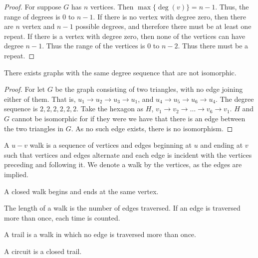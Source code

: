         \begin{proof}
        For suppose $G$ has $n$ vertices. Then $\max\{\deg(v)\} = n-1$. Thus, the range of degrees is $0$ to $n-1$. If there is no vertex with degree zero, then there are $n$ vertex and $n-1$ possible degrees, and therefore there must be at least one repeat. If there is a vertex with degree zero, then none of the vertices can have degree $n-1$. Thus the range of the vertices is $0$ to $n-2$. Thus there must be a repeat. 
        \end{proof}
        \begin{theorem}
        There exists graphs with the same degree sequence that are not
        isomorphic.
        \end{theorem}
        \begin{proof}
        For let $G$ be the graph consisting of two triangles, with no edge joining either of them. That is, $u_1\rightarrow u_2 \rightarrow u_3\rightarrow u_1$, and $u_4\rightarrow u_5 \rightarrow u_6 \rightarrow u_4$. The degree sequence is $2,2,2,2,2,2$. Take the hexagon as $H$, $v_1\rightarrow v_2 \rightarrow \hdots \rightarrow v_6 \rightarrow v_1$. $H$ and $G$ cannot be isomorphic for if they were we have that there is an edge between the two triangles in $G$. As no such edge exists, there is no isomorphism.
        \end{proof}
        \begin{definition}
        A $u-v$ walk is a sequence of vertices and edges beginning at $u$ and ending at $v$ such that vertices and edges alternate and each edge is incident with the vertices preceding and following it. We denote a walk by the vertices, as the edges are implied.
        \end{definition}
        \begin{definition}
        A closed walk begins and ends at the same vertex.
        \end{definition}
        \begin{definition}
        The length of a walk is the number of edges traversed. If an edge is traversed more than once, each time is counted.
        \end{definition}
        \begin{definition}
        A trail is a walk in which no edge is traversed more than once.
        \end{definition}
        \begin{definition} A circuit is a closed trail.
        \end{definition}
